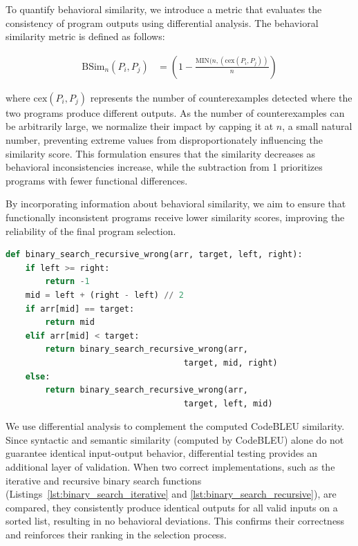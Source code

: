 \documentclass{article}
\begin{document}
To quantify behavioral similarity, we introduce a metric that evaluates the consistency of program outputs using differential analysis. The behavioral similarity metric is defined as follows:

\begin{equation}
\label{eq:beh_similarity}
\begin{split}
    \text{BSim}_n(P_i, P_j) &=  \left(1 - \frac{\text{MIN}(n, ({\text{cex}}(P_i, P_j))}{n} \right)
\end{split}
\end{equation}

\noindent where \( \text{cex}(P_i, P_j) \) represents the number of counterexamples detected where the two programs produce different outputs. As the number of counterexamples can be arbitrarily large, we normalize their impact by capping it at \( n \), a small natural number, preventing extreme values from disproportionately influencing the similarity score. This formulation ensures that the similarity decreases as behavioral inconsistencies increase, while the subtraction from 1 prioritizes programs with fewer functional differences.

By incorporating information about behavioral similarity, we aim to ensure that functionally inconsistent programs receive lower similarity scores, improving the reliability of the final program selection.

\begin{lstlisting}[language=Python, caption={Incorrect Recursive Binary Search Implementation}, label={lst:binary_search_recursive_wrong}]
def binary_search_recursive_wrong(arr, target, left, right):
    if left >= right:
        return -1
    mid = left + (right - left) // 2
    if arr[mid] == target:
        return mid
    elif arr[mid] < target:
        return binary_search_recursive_wrong(arr, 
                                    target, mid, right)
    else:
        return binary_search_recursive_wrong(arr, 
                                    target, left, mid)
\end{lstlisting}

We use differential analysis to complement the computed CodeBLEU  similarity. 
Since syntactic and semantic similarity (computed by CodeBLEU) alone do not guarantee identical input-output behavior, differential testing provides an additional layer of validation. When two correct implementations, such as the iterative and recursive binary search functions (Listings~\ref{lst:binary_search_iterative} and \ref{lst:binary_search_recursive}), are compared, they consistently produce identical outputs for all valid inputs on a sorted list, resulting in no behavioral deviations. This confirms their correctness and reinforces their ranking in the selection process.
\end{document}
